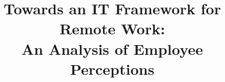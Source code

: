\documentclass[a4paper, conference]{IEEEtran}
\begin{document}
%

\title{Towards an IT Framework for Remote Work:\\An  Analysis of Employee Perceptions}
\end{document}
